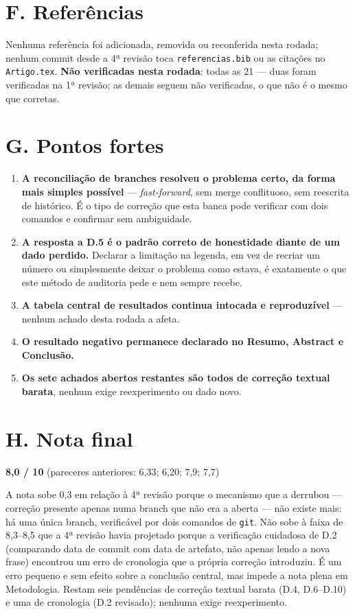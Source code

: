 \documentclass[11pt,a4paper]{article}
\begin{document}
\section*{F. Referências}

Nenhuma referência foi adicionada, removida ou reconferida nesta rodada; nenhum commit desde a 4ª
revisão toca \texttt{referencias.bib} ou as citações no \texttt{Artigo.tex}. \textbf{Não verificadas
nesta rodada}: todas as 21 --- duas foram verificadas na 1ª revisão; as demais seguem não verificadas,
o que não é o mesmo que corretas.

\section*{G. Pontos fortes}

\begin{enumerate}
  \item \textbf{A reconciliação de branches resolveu o problema certo, da forma mais simples
  possível} --- \textit{fast-forward}, sem merge conflituoso, sem reescrita de histórico. É o tipo de
  correção que esta banca pode verificar com dois comandos e confirmar sem ambiguidade.
  \item \textbf{A resposta a D.5 é o padrão correto de honestidade diante de um dado perdido.}
  Declarar a limitação na legenda, em vez de recriar um número ou simplesmente deixar o problema como
  estava, é exatamente o que este método de auditoria pede e nem sempre recebe.
  \item \textbf{A tabela central de resultados continua intocada e reproduzível} --- nenhum achado
  desta rodada a afeta.
  \item \textbf{O resultado negativo permanece declarado no Resumo, Abstract e Conclusão.}
  \item \textbf{Os sete achados abertos restantes são todos de correção textual barata}, nenhum exige
  reexperimento ou dado novo.
\end{enumerate}

\section*{H. Nota final}

\begin{center}
\Large\textbf{8,0 / 10} \quad\normalsize (pareceres anteriores: 6,33; 6,20; 7,9; 7,7)
\end{center}

A nota sobe 0,3 em relação à 4ª revisão porque o mecanismo que a derrubou --- correção presente apenas
numa branch que não era a aberta --- não existe mais: há uma única branch, verificável por dois
comandos de \texttt{git}. Não sobe à faixa de 8,3--8,5 que a 4ª revisão havia projetado porque a
verificação cuidadosa de D.2 (comparando data de commit com data de artefato, não apenas lendo a nova
frase) encontrou um erro de cronologia que a própria correção introduziu. É um erro pequeno e sem
efeito sobre a conclusão central, mas impede a nota plena em Metodologia. Restam seis pendências de
correção textual barata (D.4, D.6--D.10) e uma de cronologia (D.2 revisado); nenhuma exige
reexperimento.
\end{document}
